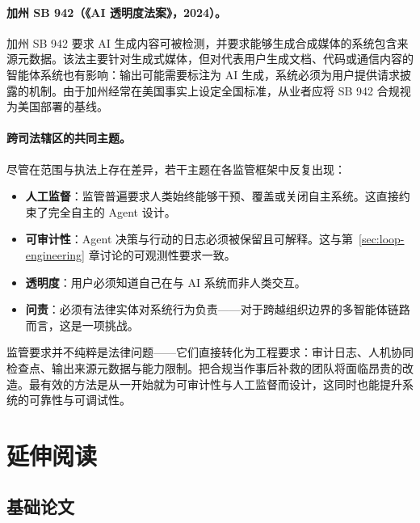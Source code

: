 \paragraph{加州 SB 942（《AI 透明度法案》，2024）。}
加州 SB 942 要求 AI 生成内容可被检测，并要求能够生成合成媒体的系统包含来源元数据。该法主要针对生成式媒体，但对代表用户生成文档、代码或通信内容的智能体系统也有影响：输出可能需要标注为 AI 生成，系统必须为用户提供请求披露的机制。由于加州经常在美国事实上设定全国标准，从业者应将 SB 942 合规视为美国部署的基线。

\paragraph{跨司法辖区的共同主题。}
尽管在范围与执法上存在差异，若干主题在各监管框架中反复出现：
\begin{itemize}
  \item \textbf{人工监督}：监管普遍要求人类始终能够干预、覆盖或关闭自主系统。这直接约束了完全自主的 Agent 设计。
  \item \textbf{可审计性}：Agent 决策与行动的日志必须被保留且可解释。这与第~\ref{sec:loop-engineering} 章讨论的可观测性要求一致。
  \item \textbf{透明度}：用户必须知道自己在与 AI 系统而非人类交互。
  \item \textbf{问责}：必须有法律实体对系统行为负责——对于跨越组织边界的多智能体链路而言，这是一项挑战。
\end{itemize}

\begin{keybox}[监管合规是工程要求]
监管要求并不纯粹是法律问题——它们直接转化为工程要求：审计日志、人机协同检查点、输出来源元数据与能力限制。把合规当作事后补救的团队将面临昂贵的改造。最有效的方法是从一开始就为可审计性与人工监督而设计，这同时也能提升系统的可靠性与可调试性。
\end{keybox}

\section{延伸阅读}
\label{further-reading}

\subsection{基础论文}
\label{foundational-papers}

